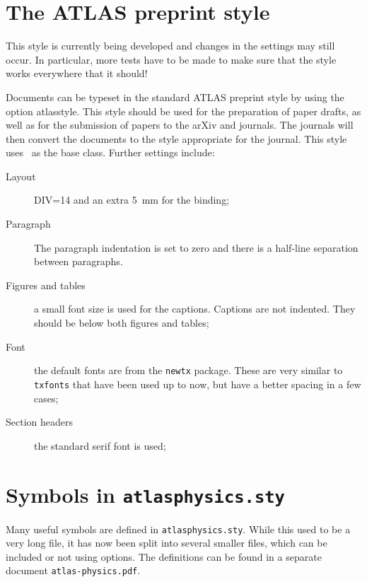 \documentclass[atlasstyle,UKenglish]{latex/atlasdoc}
\newcommand{\File}[1]{\texttt{#1}\xspace}
\newcommand{\Option}[1]{\textsf{#1}\xspace}
\newcommand{\Package}[1]{\texttt{#1}\xspace}
\begin{document}
\section{The ATLAS preprint style}
\label{sec:atlasstyle}

This style is currently being developed and changes in the settings may still occur.
In particular, more tests have to be made to make sure that the style
works everywhere that it should!

Documents can be typeset in the standard ATLAS preprint style by using the option
\Option{atlasstyle}.
This style should be used for the preparation of paper drafts,
as well as for the submission of papers to the arXiv and journals.
The journals will then convert the documents to the style appropriate for the journal.
This style uses \KOMAScript\ as the base class.
Further settings include:
\begin{description}
\item[Layout] \Option{DIV=14} and an extra \SI{5}{\mm} for the binding;
\item[Paragraph] The paragraph indentation is set to zero and 
  there is a half-line separation between paragraphs.
\item[Figures and tables] a small font size is used for the captions.
  Captions are not indented.
  They should be below both figures and tables;
\item[Font] the default fonts are from the \Package{newtx} package.
  These are very similar to \Package{txfonts} that have been used up to now,
  but have a better spacing in a few cases;
\item[Section headers] the standard serif font is used;
\end{description}

\section{Symbols in \texttt{atlasphysics.sty}}
\label{sec:atlasphysics}

Many useful symbols are defined in \texttt{atlasphysics.sty}.
While this used to be a very long file, it has now been split into several smaller files,
which can be included or not using options.
The definitions can be found in a separate document \File{atlas-physics.pdf}.
\end{document}
